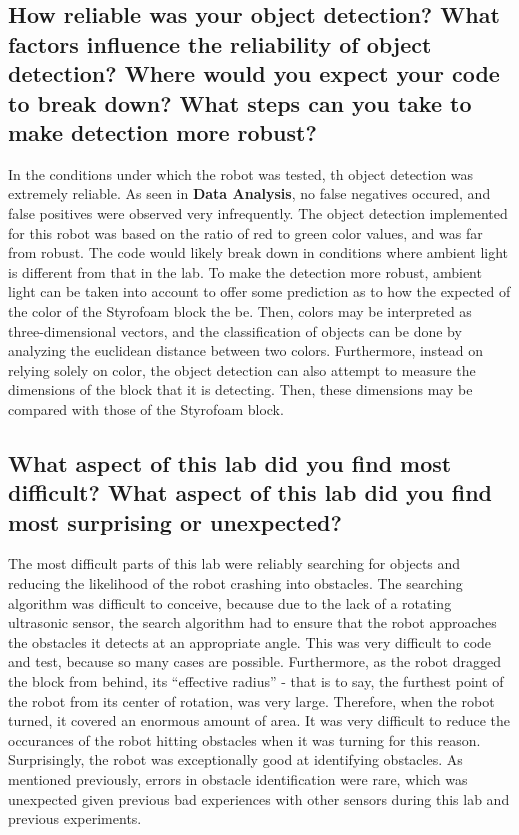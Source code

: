 \documentclass[10pt]{article}
\begin{document}
\subsection{How reliable was your object detection? What factors influence the reliability of object
	detection? Where would you expect your code to break down? What steps can you take to make
detection more robust?}
In the conditions under which the robot was tested, th object detection was extremely reliable. As
seen in \textbf{Data Analysis}, no false negatives occured, and false positives were observed very
infrequently. The object detection implemented for this robot was based on the ratio of red to green
color values, and was far from robust. The code would likely break down in conditions where ambient
light is different from that in the lab. To make the detection more robust, ambient light can be
taken into account to offer some prediction as to how the expected of the color of the Styrofoam
block the be. Then, colors may be interpreted as three-dimensional vectors, and the classification
of objects can be done by analyzing the euclidean distance between two colors. Furthermore, instead
on relying solely on color, the object detection can also attempt to measure the dimensions of the
block that it is detecting. Then, these dimensions may be compared with those of the Styrofoam
block.
\subsection{What aspect of this lab did you find most difficult? What aspect of this lab did you
find most surprising or unexpected?}
The most difficult parts of this lab were reliably searching for objects and reducing the likelihood
of the robot crashing into obstacles. The searching algorithm was difficult to conceive, because due
to the lack of a rotating ultrasonic sensor, the search algorithm had to ensure that the robot
approaches the obstacles it detects at an appropriate angle. This was very difficult to code and
test, because so many cases are possible. Furthermore, as the robot dragged the block from behind,
its ``effective radius'' - that is to say, the furthest point of the robot from its center of
rotation, was very large. Therefore, when the robot turned, it covered an enormous amount of area.
It was very difficult to reduce the occurances of the robot hitting obstacles when it was turning
for this reason. Surprisingly, the robot was exceptionally good at identifying obstacles. As
mentioned previously, errors in obstacle identification were rare, which was unexpected given
previous bad experiences with other sensors during this lab and previous experiments.
\end{document}
